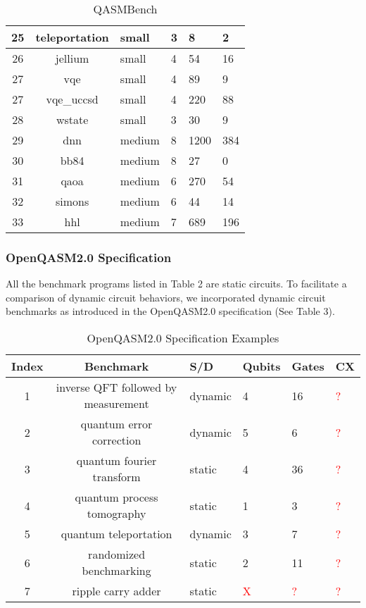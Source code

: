 \documentclass[10pt,a4paper]{article}
\newcommand{\<}{\langle}
\renewcommand{\>}{\rangle}
\newcommand{\red}[1]{\textcolor{red}{#1}}
\newcommand{\todo}{\red{?}}
\begin{document}
\begin{table}[h]
\begin{tabularx}{\textwidth}{|c|c|X|X|X|X|}
\hline
25 & teleportation & small & 3 & 8 & 2 \\
\hline
26 & jellium & small & 4 & 54 & 16 \\
\hline
27 & vqe & small & 4 & 89 & 9 \\
\hline
27 & vqe\_uccsd & small & 4 & 220 & 88 \\
\hline
28 & wstate & small & 3 & 30 & 9 \\
\hline
29 & dnn & medium & 8 & 1200 & 384 \\
\hline
30 & bb84 & medium & 8 & 27 & 0 \\
\hline
31 & qaoa & medium & 6 & 270 & 54 \\
\hline
32 & simons & medium & 6 & 44 & 14 \\
\hline
33 & hhl & medium & 7 & 689 & 196 \\
\hline
\end{tabularx}
\caption{QASMBench}
\label{table:qbenchmarks}
\end{table}

\subsubsection{OpenQASM2.0 Specification}

All the benchmark programs listed in Table 2 are static circuits. To facilitate a comparison
of dynamic circuit behaviors, we incorporated dynamic circuit benchmarks as introduced in the
OpenQASM2.0 specification (See Table 3).

\begin{table}[h]
\centering
\begin{tabularx}{\textwidth}{|c|c|X|X|X|X|}
\hline
\textbf{Index} & \textbf{Benchmark} & \textbf{S/D} & \textbf{Qubits} & \textbf{Gates} & \textbf{CX} \\
\hline
1 & inverse QFT followed by measurement & dynamic & 4 & 16 & \todo \\
\hline
2 & quantum error correction & dynamic & 5 & 6 & \todo \\
\hline
3 & quantum fourier transform & static & 4 & 36 & \todo \\
\hline
4 & quantum process tomography & static & 1 & 3 & \todo \\
\hline
5 & quantum teleportation & dynamic & 3 & 7 & \todo \\
\hline
6 & randomized benchmarking & static & 2 & 11 & \todo \\
\hline
7 & ripple carry adder & static & \red{X} & \todo & \todo \\
\hline
\end{tabularx}
\caption{OpenQASM2.0 Specification Examples}
\label{table:qbenchmarks}
\end{table}
\end{document}
